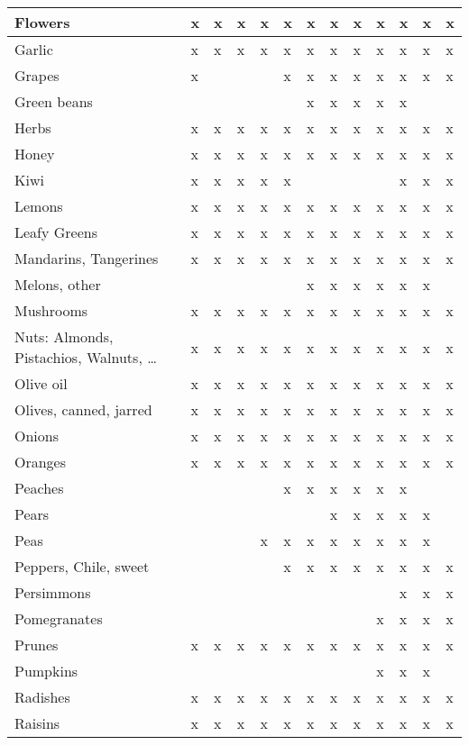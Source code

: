 \documentclass[../main.tex]{subfiles}
\begin{document}
\begin{longtable}{l|l|l|l|l|l|l|l|l|l|l|l|l|}
    Flowers &x &x &x &x &x &x &x &x &x &x &x &x \\ \hline
    Garlic &x &x &x &x &x &x &x &x &x &x &x &x \\ \hline
    Grapes &x & & & &x &x &x &x &x &x &x &x \\ \hline
    Green beans & & & & & &x &x &x &x &x & & \\ \hline
    Herbs &x &x &x &x &x &x &x &x &x &x &x &x \\ \hline
    Honey &x &x &x &x &x &x &x &x &x &x &x &x \\ \hline
    Kiwi &x &x &x &x &x & & & & &x &x &x \\ \hline
    Lemons &x &x &x &x &x &x &x &x &x &x &x &x \\ \hline
    Leafy Greens &x &x &x &x &x &x &x &x &x &x &x &x \\ \hline
    Mandarins, Tangerines &x &x &x &x &x &x &x &x &x &x &x &x \\ \hline
    Melons, other & & & & & &x &x &x &x &x &x & \\ \hline
    Mushrooms &x &x &x &x &x &x &x &x &x &x &x &x \\ \hline
    Nuts: Almonds, Pistachios, Walnuts, \ldots &x &x &x &x &x &x &x &x &x &x &x &x \\ \hline
    Olive oil &x &x &x &x &x &x &x &x &x &x &x &x \\ \hline
    Olives, canned, jarred  &x &x &x &x &x &x &x &x &x &x &x &x \\ \hline
    Onions &x &x &x &x &x &x &x &x &x &x &x &x \\ \hline
    Oranges &x &x &x &x &x &x &x &x &x &x &x &x \\ \hline
    Peaches & & & & &x &x &x &x &x &x & & \\ \hline
    Pears & & & & & & &x &x &x &x &x & \\ \hline
    Peas & & & &x &x &x &x &x &x &x &x & \\ \hline
    Peppers, Chile, sweet & & & & &x &x &x &x &x &x &x &x \\ \hline
    Persimmons & & & & & & & & & &x &x &x \\ \hline
    Pomegranates & & & & & & & & &x &x &x &x \\ \hline
    Prunes &x &x &x &x &x &x &x &x &x &x &x &x \\ \hline
    Pumpkins & & & & & & & & &x &x &x & \\ \hline
    Radishes &x &x &x &x &x &x &x &x &x &x &x &x \\ \hline
    Raisins &x &x &x &x &x &x &x &x &x &x &x &x \\ \hline

\end{longtable}
\end{document}
